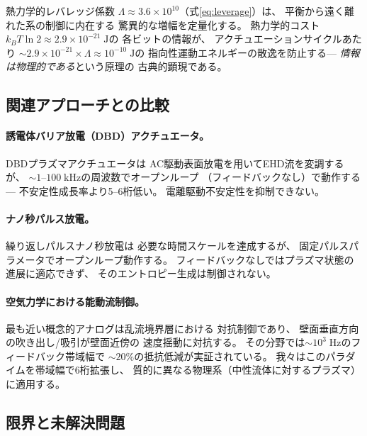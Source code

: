 \documentclass[12pt,twocolumn]{ltjsarticle}
\begin{document}
熱力学的レバレッジ係数
$\Lambda \approx 3.6 \times 10^{10}$（式\ref{eq:leverage}）は、
平衡から遠く離れた系の制御に内在する
驚異的な増幅を定量化する。
熱力学的コスト$k_B T \ln 2 \approx 2.9 \times 10^{-21}\;\mathrm{J}$の
各ビットの情報が、
アクチュエーションサイクルあたり
$\sim 2.9 \times 10^{-21} \times \Lambda \approx 10^{-10}\;\mathrm{J}$の
指向性運動エネルギーの散逸を防止する---
\emph{情報は物理的である}\cite{Landauer1961}という原理の
古典的顕現である。

\subsection{関連アプローチとの比較}
\label{sec:discussion:comparison}

\paragraph{誘電体バリア放電（DBD）アクチュエータ。}
DBDプラズマアクチュエータ\cite{Moreau2007, Corke2010}は
AC駆動表面放電を用いてEHD流を変調するが、
$\sim 1$--$100\;\mathrm{kHz}$の周波数でオープンループ
（フィードバックなし）で動作する---
不安定性成長率より5--6桁低い。
電離駆動不安定性を抑制できない。

\paragraph{ナノ秒パルス放電。}
繰り返しパルスナノ秒放電\cite{Starikovskiy2013, Adamovich2017}は
必要な時間スケールを達成するが、
固定パルスパラメータでオープンループ動作する。
フィードバックなしではプラズマ状態の進展に適応できず、
そのエントロピー生成は制御されない。

\paragraph{空気力学における能動流制御。}
最も近い概念的アナログは乱流境界層における
対抗制御\cite{Choi1994, Kim2003, Bewley2001}であり、
壁面垂直方向の吹き出し/吸引が壁面近傍の
速度揺動に対抗する。
その分野では$\sim 10^3\;\mathrm{Hz}$のフィードバック帯域幅で
$\sim 20\%$の抵抗低減が実証されている。
我々はこのパラダイムを帯域幅で6桁拡張し、
質的に異なる物理系（中性流体に対するプラズマ）に適用する。

\subsection{限界と未解決問題}
\label{sec:discussion:limitations}
\end{document}
